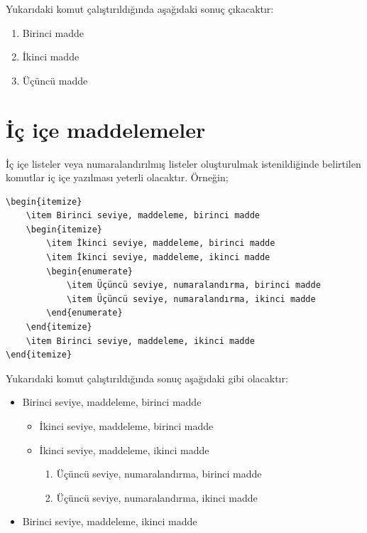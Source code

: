 Yukarıdaki komut çalıştırıldığında aşağıdaki sonuç çıkacaktır:

\begin{enumerate}
    \item Birinci madde
    \item İkinci madde
    \item Üçüncü madde
\end{enumerate}

\section{İç içe maddelemeler}
İç içe listeler veya numaralandırılmış listeler oluşturulmak istenildiğinde belirtilen komutlar iç içe yazılması yeterli olacaktır. Örneğin;

\begin{verbatim}
\begin{itemize}
    \item Birinci seviye, maddeleme, birinci madde
    \begin{itemize}
        \item İkinci seviye, maddeleme, birinci madde
        \item İkinci seviye, maddeleme, ikinci madde
        \begin{enumerate}
            \item Üçüncü seviye, numaralandırma, birinci madde
            \item Üçüncü seviye, numaralandırma, ikinci madde
        \end{enumerate}
    \end{itemize}
    \item Birinci seviye, maddeleme, ikinci madde
\end{itemize}
\end{verbatim}

Yukarıdaki komut çalıştırıldığında sonuç aşağıdaki gibi olacaktır:

\begin{itemize}
    \item Birinci seviye, maddeleme, birinci madde
    \begin{itemize}
        \item İkinci seviye, maddeleme, birinci madde
        \item İkinci seviye, maddeleme, ikinci madde
        \begin{enumerate}
            \item Üçüncü seviye, numaralandırma, birinci madde
            \item Üçüncü seviye, numaralandırma, ikinci madde
        \end{enumerate}
    \end{itemize}
    \item Birinci seviye, maddeleme, ikinci madde
\end{itemize}

